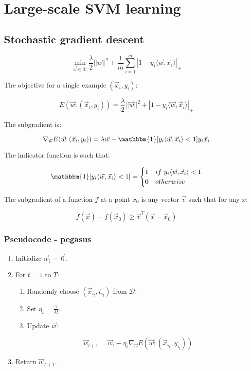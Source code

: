 \section{Large-scale SVM learning}

	\subsection{Stochastic gradient descent}

	$$\min\limits_{\vec{w}\in\mathcal{X}}\frac{\lambda}{2}||\vec{w}||^2+\frac{1}{m}\sum\limits_{i=1}^m|1-y_i\langle\vec{w},\vec{x}_i\rangle|_+$$

	The objective for a single example $(\vec{x}_i, y_i)$:

	$$E(\vec{w}; (\vec{x}_i, y_i)) = \frac{\lambda}{2}||\vec{w}||^2+|1-y_i\langle\vec{w},\vec{x}_i\rangle|_+$$

	The subgradient is:

	$$\nabla_{\vec{w}}E(\vec{w};(\vec{x}_i, y_i)) = \lambda\vec{w}-\mathbbm{1}[y_i\langle\vec{w},\vec{x}_i\rangle < 1]y_i\vec{x}_i$$

	The indicator function is such that:

	$$\mathbbm{1}[y_i\langle\vec{w}, \vec{x}_i\rangle< 1] = \begin{cases}1 &if\ y_i\langle\vec{w},\vec{x}_i\rangle < 1\\ 0 &otherwise\end{cases}$$

	The subgradient of a function $f$ at a point $x_0$ is any vector $\vec{v}$ such that for any $x$:

	$$f(\vec{x}) - f(\vec{x}_0)\ge \vec{v}^T(\vec{x}-\vec{x}_0)$$

		\subsubsection{Pseudocode - pegasus}

		\begin{enumerate}
			\item Initialize $\vec{w}_1 = \vec{0}$.
			\item For $t = 1 $ to $T$:
				\begin{enumerate}
					\item Randomly choose $(\vec{x}_{i_t}, t_{i_t})$ from $\mathcal{D}$.
					\item Set $\eta_t = \frac{1}{\lambda t}$.
					\item Update $\vec{w}$:

						$$\vec{w}_{t+1} = \vec{w}_t - \eta_t\nabla_{\vec{w}}E(\vec{w};(\vec{x}_{i_t}, y_{i_t}))$$

				\end{enumerate}
			\item Return $\vec{w}_{T+1}$.
		\end{enumerate}

